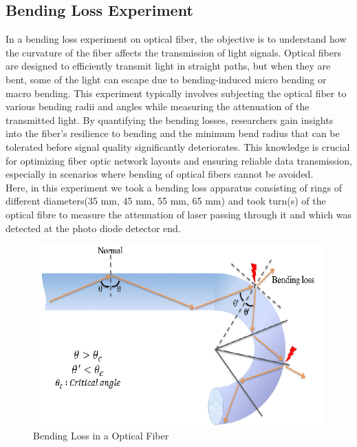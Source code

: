 \subsection{\label{sec:intro_level3}Bending Loss Experiment}
In a bending loss experiment on optical fiber, the objective is to understand how the curvature of the fiber affects the transmission of light signals. Optical fibers are designed to efficiently transmit light in straight paths, but when they are bent, some of the light can escape due to bending-induced micro bending or macro bending. This experiment typically involves subjecting the optical fiber to various bending radii and angles while measuring the attenuation of the transmitted light. By quantifying the bending losses, researchers gain insights into the fiber's resilience to bending and the minimum bend radius that can be tolerated before signal quality significantly deteriorates. This knowledge is crucial for optimizing fiber optic network layouts and ensuring reliable data transmission, especially in scenarios where bending of optical fibers cannot be avoided.\\
Here, in this experiment we took a bending loss apparatus consisting of rings of different diameters(35 mm, 45 mm, 55 mm, 65 mm) and took turn(s) of the optical fibre to measure the attenuation of laser passing through it and which was detected at the photo diode detector end.\\
\begin{figure}
    \centering
    \includegraphics[scale=0.5]{chapters/Schematic-diagram-of-the-bending-loss-in-a-bent-optical-fiber.png}
    \caption{Bending Loss in a Optical Fiber}
\end{figure}
